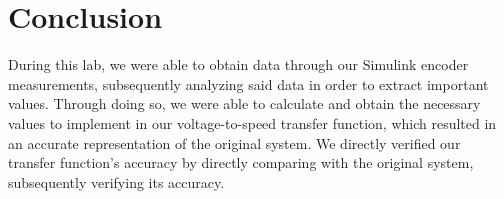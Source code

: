 \documentclass{article}
\begin{document}
\section{Conclusion}
During this lab, we were able to obtain data through our Simulink encoder measurements, subsequently analyzing said data in order to extract important values. Through doing so, we were able to calculate and obtain the necessary values to implement in our voltage-to-speed transfer function, which resulted in an accurate representation of the original system. We directly verified our transfer function's accuracy by directly comparing with the original system, subsequently verifying its accuracy.
\end{document}
